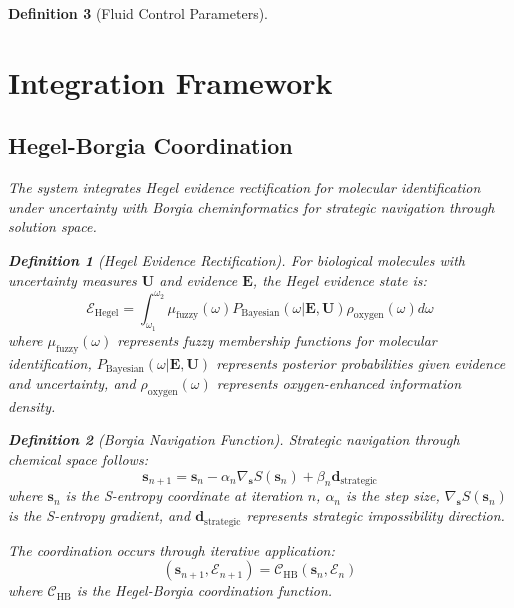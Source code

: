 \documentclass[12pt,a4paper]{article}
\newtheorem{definition}{Definition}
\begin{document}
\begin{definition}[Fluid Control Parameters]
\section{Integration Framework}

\subsection{Hegel-Borgia Coordination}

The system integrates Hegel evidence rectification for molecular identification under uncertainty with Borgia cheminformatics for strategic navigation through solution space.

\begin{definition}[Hegel Evidence Rectification]
For biological molecules with uncertainty measures $\mathbf{U}$ and evidence $\mathbf{E}$, the Hegel evidence state is:
\begin{equation}
\mathcal{E}_{\text{Hegel}} = \int_{\omega_1}^{\omega_2} \mu_{\text{fuzzy}}(\omega) P_{\text{Bayesian}}(\omega | \mathbf{E}, \mathbf{U}) \rho_{\text{oxygen}}(\omega) d\omega
\end{equation}
where $\mu_{\text{fuzzy}}(\omega)$ represents fuzzy membership functions for molecular identification, $P_{\text{Bayesian}}(\omega | \mathbf{E}, \mathbf{U})$ represents posterior probabilities given evidence and uncertainty, and $\rho_{\text{oxygen}}(\omega)$ represents oxygen-enhanced information density.
\end{definition}

\begin{definition}[Borgia Navigation Function]
Strategic navigation through chemical space follows:
\begin{equation}
\mathbf{s}_{n+1} = \mathbf{s}_n - \alpha_n \nabla_{\mathbf{s}} S(\mathbf{s}_n) + \beta_n \mathbf{d}_{\text{strategic}}
\end{equation}
where $\mathbf{s}_n$ is the S-entropy coordinate at iteration $n$, $\alpha_n$ is the step size, $\nabla_{\mathbf{s}} S(\mathbf{s}_n)$ is the S-entropy gradient, and $\mathbf{d}_{\text{strategic}}$ represents strategic impossibility direction.
\end{definition}

The coordination occurs through iterative application:
\begin{equation}
(\mathbf{s}_{n+1}, \mathcal{E}_{n+1}) = \mathcal{C}_{\text{HB}}(\mathbf{s}_n, \mathcal{E}_n)
\end{equation}
where $\mathcal{C}_{\text{HB}}$ is the Hegel-Borgia coordination function.


\end{definition}
\end{document}
